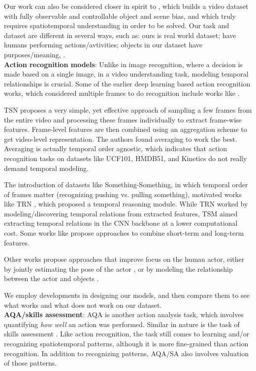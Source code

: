 \documentclass[final]{cvpr}
\begin{document}
Our work can also be considered closer in spirit to \cite{girdhar2019cater}, which builds a video dataset with fully observable and controllable object and scene bias, and which truly requires spatiotemporal understanding in order to be solved. Our task and dataset are different in several ways, such as: ours is real world dataset; have humans performing actions/avtivities; objects in our dataset have purposes/meaning, \etc.\\

\noindent\textbf{Action recognition models}: Unlike in image recognition, where a decision is made based on a single image, in a video understanding task, modeling temporal relationships is crucial. Some of the earlier deep learning based action recognition works, which considered multiple frames to do recognition include works like \cite{sports1m, beyondsnippets, lrcn}.

TSN \cite{tsn} proposes a very simple, yet effective approach of sampling a few frames from the entire video and processing these frames individually to extract frame-wise features. Frame-level features are then combined  using an aggregation scheme to get video-level representation. The authors found averaging to work the best. Averaging is actually temporal order agnostic, which indicates that action recognition tasks on datasets like UCF101, HMDB51, and Kinetics do not really demand temporal modeling.

The introduction of datasets like Something-Something, in which temporal order of frames matter (\eg recognizing pushing vs. pulling something), motivated works like TRN \cite{trn}, which proposed a temporal reasoning module. While TRN worked by modeling/discovering temporal relations from extracted features, TSM \cite{tsm} aimed extracting temporal relations in the CNN backbone at a lower computational cost. Some works like \cite{slowfast, ltfb} propose approaches to combine short-term and long-term features.

Other works propose approaches that improve focus on the human actor, either by jointly estimating the pose of the actor  \cite{actemes, luvizon2d3d}, or by modeling the relationship between the actor and objects \cite{acrn}.

We employ developments in designing our models, and then compare them to see what works and what does not work on our dataset.\\ 

\noindent\textbf{AQA/skills assessment}: AQA \cite{parmar2016measuring, ltsoe, s3d, li2018end, xu_fs, maqa, mtlaqa, pan_aqa, musdl, hand_aqa, sardari2019view, zeng2020hybrid, lei2020learning, wang2020assessing} is another action analysis task, which involves quantifying \textit{how well} an action was performed. Similar in nature is the task of skills assessment \cite{doughty2018s, manipulation, proscons, parmar2021piano}. Like action recognition, the task still comes to learning and/or recognizing spatiotemporal patterns, although it is more fine-grained than action recognition. In addition to recognizing patterns, AQA/SA also involves valuation of those patterns.
\end{document}
